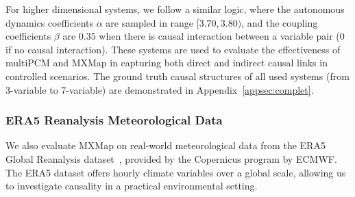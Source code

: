 

For higher dimensional systems, we follow a similar logic, where the autonomous dynamics coefficients $\alpha$ are sampled in range $[3.70, 3.80)$, and the coupling coefficients $\beta$ are 0.35 when there is causal interaction between a variable pair (0 if no causal interaction). These systems are used to evaluate the effectiveness of multiPCM and MXMap in capturing both direct and indirect causal links in controlled scenarios. The ground truth causal structures of all used systems (from 3-variable to 7-variable) are demonstrated in Appendix~\ref{appsec:complet}.



\subsubsection{ERA5 Reanalysis Meteorological Data}

We also evaluate MXMap on real-world meteorological data from the ERA5 Global Reanalysis dataset~\citep{hersbach2020era5}, provided by the Copernicus program by ECMWF. The ERA5 dataset offers hourly climate variables over a global scale, allowing us to investigate causality in a practical environmental setting.


